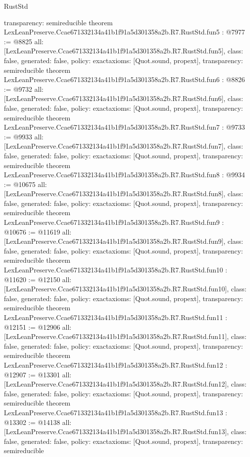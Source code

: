 \begin{lexlean}{RustStd}
\begin{coremodule}
{  transparency: semireducible
}
theorem LexLeanPreserve.Ccae671332134a41b1f91a5d301358a2b.R7.RustStd.fun5 : @7977 := @8825 {
  all: [LexLeanPreserve.Ccae671332134a41b1f91a5d301358a2b.R7.RustStd.fun5],
  class: false,
  generated: false,
  policy: exact{axioms: [Quot.sound, propext]},
  transparency: semireducible
}
theorem LexLeanPreserve.Ccae671332134a41b1f91a5d301358a2b.R7.RustStd.fun6 : @8826 := @9732 {
  all: [LexLeanPreserve.Ccae671332134a41b1f91a5d301358a2b.R7.RustStd.fun6],
  class: false,
  generated: false,
  policy: exact{axioms: [Quot.sound, propext]},
  transparency: semireducible
}
theorem LexLeanPreserve.Ccae671332134a41b1f91a5d301358a2b.R7.RustStd.fun7 : @9733 := @9933 {
  all: [LexLeanPreserve.Ccae671332134a41b1f91a5d301358a2b.R7.RustStd.fun7],
  class: false,
  generated: false,
  policy: exact{axioms: [Quot.sound, propext]},
  transparency: semireducible
}
theorem LexLeanPreserve.Ccae671332134a41b1f91a5d301358a2b.R7.RustStd.fun8 : @9934 := @10675 {
  all: [LexLeanPreserve.Ccae671332134a41b1f91a5d301358a2b.R7.RustStd.fun8],
  class: false,
  generated: false,
  policy: exact{axioms: [Quot.sound, propext]},
  transparency: semireducible
}
theorem LexLeanPreserve.Ccae671332134a41b1f91a5d301358a2b.R7.RustStd.fun9 : @10676 := @11619 {
  all: [LexLeanPreserve.Ccae671332134a41b1f91a5d301358a2b.R7.RustStd.fun9],
  class: false,
  generated: false,
  policy: exact{axioms: [Quot.sound, propext]},
  transparency: semireducible
}
theorem LexLeanPreserve.Ccae671332134a41b1f91a5d301358a2b.R7.RustStd.fun10 : @11620 := @12150 {
  all: [LexLeanPreserve.Ccae671332134a41b1f91a5d301358a2b.R7.RustStd.fun10],
  class: false,
  generated: false,
  policy: exact{axioms: [Quot.sound, propext]},
  transparency: semireducible
}
theorem LexLeanPreserve.Ccae671332134a41b1f91a5d301358a2b.R7.RustStd.fun11 : @12151 := @12906 {
  all: [LexLeanPreserve.Ccae671332134a41b1f91a5d301358a2b.R7.RustStd.fun11],
  class: false,
  generated: false,
  policy: exact{axioms: [Quot.sound, propext]},
  transparency: semireducible
}
theorem LexLeanPreserve.Ccae671332134a41b1f91a5d301358a2b.R7.RustStd.fun12 : @12907 := @13301 {
  all: [LexLeanPreserve.Ccae671332134a41b1f91a5d301358a2b.R7.RustStd.fun12],
  class: false,
  generated: false,
  policy: exact{axioms: [Quot.sound, propext]},
  transparency: semireducible
}
theorem LexLeanPreserve.Ccae671332134a41b1f91a5d301358a2b.R7.RustStd.fun13 : @13302 := @14138 {
  all: [LexLeanPreserve.Ccae671332134a41b1f91a5d301358a2b.R7.RustStd.fun13],
  class: false,
  generated: false,
  policy: exact{axioms: [Quot.sound, propext]},
  transparency: semireducible
}
\end{coremodule}
\end{lexlean}
